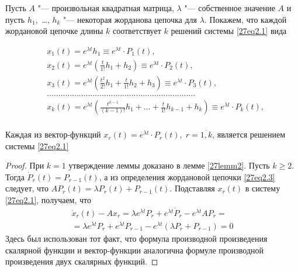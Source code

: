 Пусть $A$ "--- произвольная квадратная матрица, $\lambda$ "--- собственное значение $A$ и пусть $h_1$,~\dots, $h_k$ "--- некоторая жорданова цепочка для $\lambda$. Покажем, что каждой жордановой цепочке длины $k$ соответствует $k$ решений системы \eqref{27eq2.1} вида

\begin{equation}\label{27eq2.4}
\begin{aligned}
&x_1(t)=e^{\lambda t}h_1\equiv e^{\lambda t}\cdot P_1(t),\\
&x_2(t)=e^{\lambda t}\left( \frac{t}{1!}h_1+h_2\right)\equiv e^{\lambda t}\cdot P_2(t),\\
&x_3(t)=e^{\lambda t}\left( \frac{t^2}{2!}h_1+\frac{t}{1!}h_2+h_3\right)\equiv e^{\lambda t}\cdot P_3(t),\\
&.................................................................\\
&x_k(t)=e^{\lambda t}\left(\frac{t^{k-1}}{(k-1)!}h_1+\ldots+\frac{t}{1!}h_{k-1}+h_k\right)\equiv e^{\lambda t}\cdot P_k(t),\\
\end{aligned}
\end{equation}

\begin{lemm}\label{27lemm3}
Каждая из вектор-функций $x_r(t)=e^{\lambda t}\cdot P_r(t),\; r=\overline{1,k}$, является решением системы \eqref{27eq2.1}
\end{lemm}

\begin{proof}
При $k=1$ утверждение леммы доказано в лемме \ref{27lemm2}. Пусть $k\geq 2$. Тогда $\dot{P}_r(t)=P_{r-1}(t)$, а из определения жордановой цепочки \eqref{27eq2.3} следует, что $AP_r(t)=\lambda P_r(t)+P_{r-1}(t)$. Подставляя $x_r(t)$ в систему \eqref{27eq2.1}, получаем, что
\begin{multline*}
\dot{x}_r(t)-Ax_r=\lambda e^{\lambda t}P_r+e^{\lambda t}\dot{P}_r-e^{\lambda t}AP_r=\\=\lambda e^{\lambda t} P_r+e^{\lambda t}P_{r-1}-e^{\lambda t}(\lambda P_r+P_{r-1})=0
\end{multline*}
Здесь был использован тот факт, что формула производной произведения скалярной функции и вектор-функции аналогична формуле производной произведения двух скалярных функций.
\end{proof}


